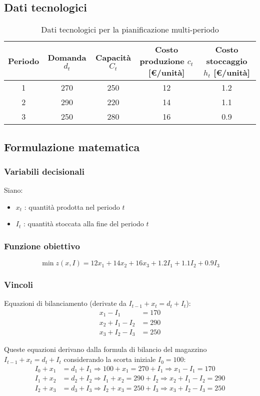 \subsection{Dati tecnologici}
\begin{table}[h]
\centering
\begin{tabular}{|c|c|c|c|c|}
\hline
Periodo & Domanda $d_t$ & Capacità $C_t$ & Costo produzione $c_t$ [€/unità] & Costo stoccaggio $h_t$ [€/unità] \\
\hline
1 & 270 & 250 & 12 & 1.2 \\
\hline
2 & 290 & 220 & 14 & 1.1 \\
\hline
3 & 250 & 280 & 16 & 0.9 \\
\hline
\end{tabular}
\caption{Dati tecnologici per la pianificazione multi-periodo}
\end{table}

\subsection{Formulazione matematica}
\subsubsection{Variabili decisionali}

Siano:
\begin{itemize}
    \item $x_t$ : quantità prodotta nel periodo $t$
    \item $I_t$ : quantità stoccata alla fine del periodo $t$
\end{itemize}

\subsubsection{Funzione obiettivo}
\[
\min z(x, I) = 12x_1 + 14x_2 + 16x_3 + 1.2I_1 + 1.1I_2 + 0.9I_3
\]

\subsubsection{Vincoli}
Equazioni di bilanciamento (derivate da $I_{t-1}+x_t=d_t+I_t$):
\[
\begin{aligned}
x_1 - I_1 &= 170 \\
x_2 + I_1 - I_2 &= 290 \\
x_3 + I_2 - I_3 &= 250
\end{aligned}
\]

Queste equazioni derivano dalla formula di bilancio del magazzino $I_{t-1}+x_t=d_t+I_t$
considerando la scorta iniziale $I_0 = 100$:
\begin{align*}
I_0 + x_1 &= d_1 + I_1 \Rightarrow 100 + x_1 = 270 + I_1 \Rightarrow x_1 - I_1 = 170 \\
I_1 + x_2 &= d_2 + I_2 \Rightarrow I_1 + x_2 = 290 + I_2 \Rightarrow x_2 + I_1 - I_2 = 290 \\
I_2 + x_3 &= d_3 + I_3 \Rightarrow I_2 + x_3 = 250 + I_3 \Rightarrow x_3 + I_2 - I_3 = 250
\end{align*}

